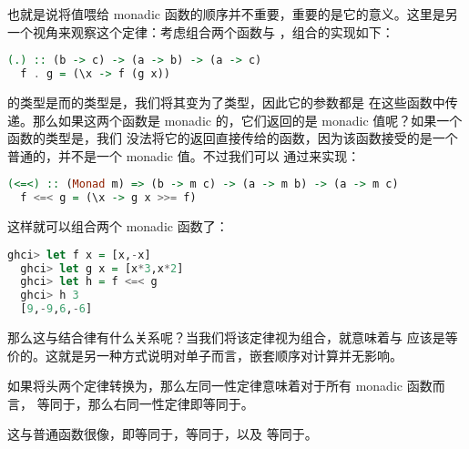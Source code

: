\documentclass[./main.tex]{subfiles}
\begin{document}
也就是说将值喂给 monadic 函数的顺序并不重要，重要的是它的意义。这里是另一个视角来观察这个定律：考虑组合两个函数与
，组合的实现如下：

\begin{lstlisting}[language=Haskell]
  (.) :: (b -> c) -> (a -> b) -> (a -> c)
  f . g = (\x -> f (g x))
\end{lstlisting}

的类型是而的类型是，我们将其变为了类型，因此它的参数都是
在这些函数中传递。那么如果这两个函数是 monadic 的，它们返回的是 monadic 值呢？如果一个函数的类型是，我们
没法将它的返回直接传给的函数，因为该函数接受的是一个普通的，并不是一个 monadic 值。不过我们可以
通过\acode{>>=}来实现：

\begin{lstlisting}[language=Haskell]
  (<=<) :: (Monad m) => (b -> m c) -> (a -> m b) -> (a -> m c)
  f <=< g = (\x -> g x >>= f)
\end{lstlisting}

这样就可以组合两个 monadic 函数了：

\begin{lstlisting}[language=Haskell]
  ghci> let f x = [x,-x]
  ghci> let g x = [x*3,x*2]
  ghci> let h = f <=< g
  ghci> h 3
  [9,-9,6,-6]
\end{lstlisting}

那么这与结合律有什么关系呢？当我们将该定律视为组合，就意味着与
应该是等价的。这就是另一种方式说明对单子而言，嵌套顺序对计算并无影响。

如果将头两个定律转换为\acode{<=<}，那么左同一性定律意味着对于所有 monadic 函数而言，
等同于，那么右同一性定律即等同于。

这与普通函数很像，即等同于，等同于，以及
等同于。
\end{document}
